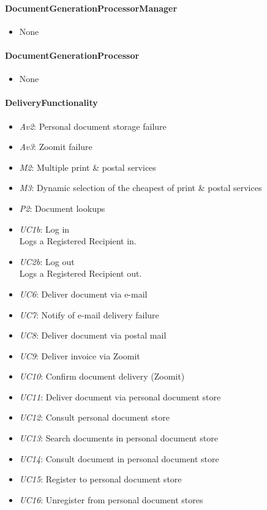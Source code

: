 \documentclass[a4paper,10pt]{article}
\begin{document}
\paragraph{DocumentGenerationProcessorManager}
\begin{itemize}
	\item None
\end{itemize}
\paragraph{DocumentGenerationProcessor}
\begin{itemize}
	\item None
\end{itemize}
\paragraph{DeliveryFunctionality}
\begin{itemize}
	\item \emph{Av2}: Personal document storage failure
	\item \emph{Av3}: Zoomit failure
	\item \emph{M2}: Multiple print \& postal services
	\item \emph{M3}: Dynamic selection of the cheapest of print \& postal services
	\item \emph{P2}: Document lookups
	\item \emph{UC1b}: Log in\\ Logs a Registered Recipient in.
    \item \emph{UC2b}: Log out\\ Logs a Registered Recipient out.
	\item \emph{UC6}: Deliver document via e-mail
 	\item \emph{UC7}: Notify of e-mail delivery failure
 	\item \emph{UC8}: Deliver document via postal mail
 	\item \emph{UC9}: Deliver invoice via Zoomit
 	\item \emph{UC10}: Confirm document delivery (Zoomit)
	\item \emph{UC11}: Deliver document via personal document store
	\item \emph{UC12}: Consult personal document store
	\item \emph{UC13}: Search documents in personal document store
	\item \emph{UC14}: Consult document  in personal document store
	\item \emph{UC15}: Register to personal document store
	\item \emph{UC16}: Unregister from personal document stores
\end{itemize}
\end{document}
